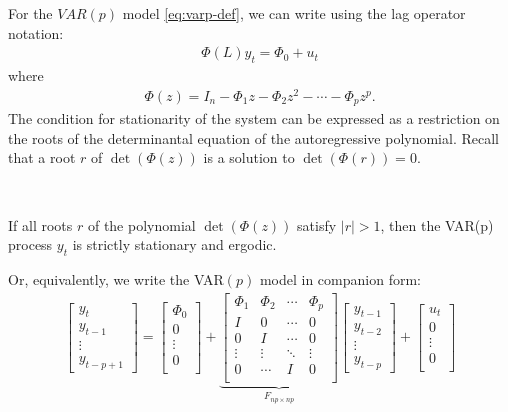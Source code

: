 For the $VAR(p)$ model \ref{eq:varp-def}, we can write using the lag operator notation:
\begin{gather*}
    \Phi (L) y_t = \Phi_0 + u_t
\end{gather*}
where
\begin{gather*}
    \Phi(z) = I_n - \Phi_1 z - \Phi_2 z^2 - \cdots - \Phi_p z^p.
\end{gather*}
The condition for stationarity of the system can be expressed as a restriction on the roots of the
determinantal equation of the autoregressive polynomial.
Recall that a root $r$ of $\det \left(\Phi(z) \right)$ is a solution to $\det \left(\Phi(r) \right) = 0$.
\begin{theorem}\label{thm:stationarity-varp}
    \

    If all roots $r$ of the polynomial $\det \left(\Phi(z) \right)$ satisfy $\vert r \vert > 1$,
    then the VAR(p) process $y_t$ is strictly stationary and ergodic.
\end{theorem}
Or, equivalently, we write the VAR$(p)$ model in companion form:
\begin{gather}\label{eq:varp-companion}
    \begin{bmatrix}
        y_t \\
        y_{t-1} \\
        \vdots \\
        y_{t-p+1}
    \end{bmatrix} = \begin{bmatrix}
         \Phi_0 \\
         0 \\
         \vdots \\
         0 \\
    \end{bmatrix} + 
    \underset{F_{np \times np}}{\underbrace{\begin{bmatrix}
        \Phi_1 & \Phi_2 & \cdots & \Phi_p \\
        I & 0 & \cdots & 0 \\
        0 & I & \cdots & 0 \\
        \vdots & \vdots & \ddots & \vdots \\
        0 & \cdots & I & 0 \\
    \end{bmatrix}}}
    \begin{bmatrix}
        y_{t-1} \\
        y_{t-2} \\
        \vdots \\
        y_{t-p}
    \end{bmatrix} + 
    \begin{bmatrix}
         u_t \\
         0 \\
         \vdots \\
         0 \\
    \end{bmatrix}
\end{gather}
